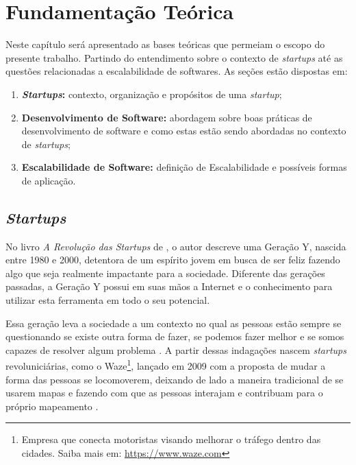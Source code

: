 \chapter{Fundamentação Teórica}

Neste capítulo será apresentado as bases teóricas que permeiam o escopo
do presente trabalho. Partindo do entendimento sobre o contexto de
\textit{startups} até as questões relacionadas a escalabilidade de softwares.
As seções estão dispostas em:

  \begin{enumerate}
    \item \textbf{\textit{Startups}:} contexto, organização e propósitos de uma 
      \textit{startup};
    \item \textbf{Desenvolvimento de Software:} abordagem sobre boas práticas
    de desenvolvimento de software e como estas estão sendo abordadas no contexto
    de \textit{startups};
    \item \textbf{Escalabilidade de Software:} definição de Escalabilidade e 
      possíveis formas de aplicação.
  \end{enumerate}

\section{\textit{Startups}}

No livro \textit{A Revolução das Startups} de ,
o autor descreve uma Geração Y, nascida entre 1980 e 2000, detentora de um
espírito jovem em busca de ser feliz fazendo algo que seja realmente
impactante para a sociedade. Diferente das gerações passadas, a Geração Y
possui em suas mãos a Internet e o conhecimento para utilizar esta
ferramenta em todo o seu potencial.

Essa geração leva a sociedade a um contexto no qual as pessoas estão sempre
se questionando se existe outra forma de fazer, se podemos fazer melhor e
se somos capazes de resolver algum problema \cite{ARevolucaoDasStartups}.
A partir dessas indagações nascem \textit{startups} revoluniciárias, como
o Waze\footnote{Empresa que conecta motoristas visando melhorar o tráfego
dentro das cidades. Saiba mais em: \url{https://www.waze.com}}, lançado em
2009 com a proposta de mudar a forma das pessoas se locomoverem, deixando 
de lado a maneira tradicional de se usarem mapas e fazendo com que as 
pessoas interajam e contribuam para o próprio mapeamento
\cite{NepomucenoSucessoDoWaze}.

